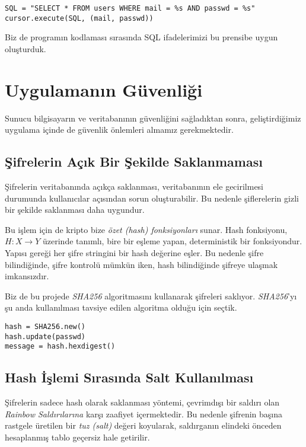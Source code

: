 \documentclass[11pt]{report}
\begin{document}
\begin{lstlisting}[caption=Python-psycopg2 SQL Injection]
SQL = "SELECT * FROM users WHERE mail = %s AND passwd = %s"
cursor.execute(SQL, (mail, passwd))
\end{lstlisting}

Biz de programın kodlaması sırasında SQL ifadelerimizi bu prensibe uygun oluşturduk.

\section{Uygulamanın Güvenliği}

Sunucu bilgisayarın ve veritabanının güvenliğini sağladıktan sonra, geliştirdiğimiz uygulama içinde de güvenlik önlemleri almamız gerekmektedir.

\subsection{Şifrelerin Açık Bir Şekilde Saklanmaması}

Şifrelerin veritabanında açıkça saklanması, veritabanının ele gecirilmesi durumunda kullanıcılar açısından sorun oluşturabilir. Bu nedenle şiflerelerin gizli bir şekilde saklanması daha uygundur.

Bu işlem için de kripto bize \emph{özet (hash) fonksiyonları} sunar. Hash fonksiyonu, $H: X \rightarrow Y$ üzerinde tanımlı, bire bir eşleme yapan, deterministik bir fonksiyondur. Yapısı gereği her şifre stringini bir hash değerine eşler. Bu nedenle şifre bilindiğinde, şifre kontrolü mümkün iken, hash bilindiğinde şifreye ulaşmak imkansızdır.

Biz de bu projede \emph{SHA256} algoritmasını kullanarak şifreleri saklıyor. \emph{SHA256}'yı şu anda kullanılması tavsiye edilen algoritma olduğu için seçtik.

\begin{lstlisting}[caption=Python SHA256 Kullanımı]
hash = SHA256.new()
hash.update(passwd)
message = hash.hexdigest()
\end{lstlisting}

\subsection{Hash İşlemi Sırasında Salt Kullanılması}

Şifrelerin sadece hash olarak saklanması yöntemi, çevrimdışı bir saldırı olan \emph{Rainbow Saldırılarına} karşı zaafiyet içermektedir. Bu nedenle şifrenin başına rastgele üretilen bir \emph{tuz (salt)} değeri koyularak, saldırganın elindeki önceden hesaplanmış tablo geçersiz hale getirilir.
\end{document}
